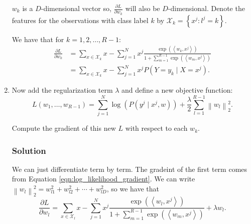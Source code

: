 \documentclass[letterpaper,11pt]{article}
\begin{document}
\begin{enumerate}
  $w_k$ is a $D$-dimensional vector so, $\frac{\partial L}{\partial w_k}$ will
  also be $D$-dimensional. Denote the features for the observations with class
  label $k$ by $\mathcal{X}_k = \left\{x^j : l^j = k\right\}$.

  We have that for $k = 1,2,\ldots,R-1$:
  \begin{align}
    \frac{\partial L}{\partial w_k}
    &= \sum_{x \in \mathcal{X}_k} x
      - \sum_{j=1}^Nx^j\frac{
      \exp\left(\left\langle w_k,x^j\right\rangle\right)
      }
      {1 + \sum_{m=1}^{R - 1}\exp\left(\left\langle w_m,x^j\right\rangle\right)}
      \label{eqn:log_likelihood_gradient}\\   
    &= \sum_{x \in \mathcal{X}_k} x -
      \sum_{j=1}^N x^j P\left(Y = y_k \mid X = x^j\right).
      \nonumber
  \end{align}
\item Now add the regularization term $\lambda$ and define a new objective
  function:
  \begin{equation}
    L\left(w_1,\ldots,w_{R-1}\right) = \sum_{j=1}^N\log\left(
      P\left(y^j \mid x^j, w\right)
    \right)
    +
    \frac{\lambda}{2}\sum_{l=1}^{R-1}\left\lVert w_l\right\rVert_2^2.
    \label{eqn:log_likelihood_with_penalty}
  \end{equation}

  Compute the gradient of this new $L$ with respect to each $w_k$.

  \subsubsection*{Solution}

  We can just differentiate term by term. The gradeint of the first term comes
  from Equation \ref{eqn:log_likelihood_gradient}. We can write
  $\left\lVert w_l\right\rVert_2^2 = w_{l1}^2 + w_{l2}^2 + \cdots + w_{lD}^2$,
  so we have that
  \begin{equation}
    \frac{\partial L}{\partial w_l}
    = \sum_{x \in \mathcal{X}_l} x
      - \sum_{j=1}^Nx^j\frac{
      \exp\left(\left\langle w_l,x^j\right\rangle\right)
      }
      {1 + \sum_{m=1}^{R - 1}\exp\left(\left\langle w_m,x^j\right\rangle\right)}
      + \lambda w_l.
  \end{equation}
\end{enumerate}
\end{document}

